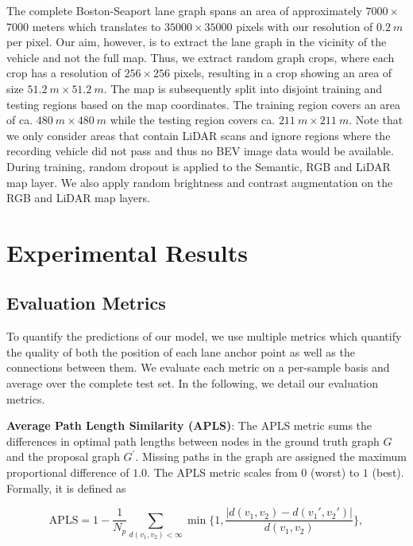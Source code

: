 \documentclass[letterpaper, 10 pt, conference]{ieeeconf}
\begin{document}
The complete Boston-Seaport lane graph spans an area of approximately $7000 \times $7000 meters which translates to $35000 \times 35000$ pixels with our resolution of $\SI{0.2}{m}$ per pixel. Our aim, however, is to extract the lane graph in the vicinity of the vehicle and not the full map. Thus, we extract random graph crops, where each crop has a resolution of $256 \times 256$ pixels, resulting in a crop showing an area of size $\SI{51.2}{m} \times \SI{51.2}{m}$. The map is subsequently split into disjoint training and testing regions based on the map coordinates. The training region  covers an area of ca. $\SI{480}{m} \times \SI{480}{m}$ while the testing region covers ca. $\SI{211}{m} \times \SI{211}{m}$. Note that we only consider areas  that contain LiDAR scans and ignore regions where the recording vehicle did not pass and thus no BEV image data would be available. During training, random dropout is applied to the Semantic, RGB and LiDAR map layer. We also apply random brightness and contrast augmentation on the RGB and LiDAR map layers.



 

\section{Experimental Results}
\label{sec:experiments}

\subsection{Evaluation Metrics}

To quantify the predictions of our model, we use multiple metrics which quantify the quality of both the position of each lane anchor point as well as the connections between them. We evaluate each metric on a per-sample basis and average over the complete test set. In the following, we detail our evaluation metrics.


\textbf{Average Path Length Similarity (APLS)}: The APLS metric \cite{van2018spacenet} sums the differences in optimal path lengths between nodes in the ground truth graph $G$ and the proposal graph $G^\prime$. Missing paths in the graph are assigned the maximum proportional difference of $1.0$. The APLS metric scales from $0$ (worst) to $1$ (best). Formally, it is defined as
    
    
\begin{equation}
    \text{APLS} = 1 - \frac{1}{N_p} \sum_{d(v_1,v_2) < \infty} \min \Big\{ 1, \frac{|d(v_1,v_2) - d(v_1',v_2') |}{d(v_1,v_2)} \Big\}, 
\end{equation}
\end{document}
